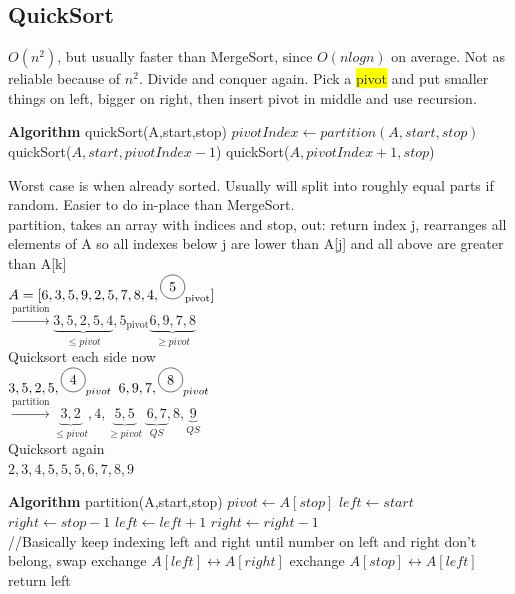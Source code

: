 \subsection{QuickSort}
$O(n^2)$, but usually faster than MergeSort, since $O(n log n)$ on average. Not as reliable because of $n^2$. Divide and conquer again. Pick a \colorbox{Yellow}{pivot} and put smaller things on left, bigger on right, then insert pivot in middle and use recursion.
\begin{algorithmic}
	\State \textbf{Algorithm} quickSort(A,start,stop)
		\State $pivotIndex \gets partition(A,start,stop)$
		\State quickSort($A,start,pivotIndex-1$)
		\State quickSort($A,pivotIndex+1,stop$)
	\EndIf
\end{algorithmic}
Worst case is when already sorted. Usually will split into roughly equal parts if random. Easier to do in-place than MergeSort.
\\ partition, takes an array with indices and stop, out: return index j, rearranges all elements of A so all indexes below j are lower than A[j] and all above are greater than A[k]
\\ $A = [6, 3, 5, 9, 2, 5, 7, 8, 4, \tikz \node[draw,circle]{5};_{\text{pivot}}]$
\\ $\stackrel{\text{partition}}{\rightarrow} \underbrace{3,5,2,5,4}_{\leq pivot}, 5_{\text{pivot}}\underbrace{6,9,7,8}_{\geq pivot}$
\\ Quicksort each side now
\\$ 3,5,2,5,\tikz\node[draw,circle]{4};_{pivot}$\hspace{20 pt} $6,9,7,\tikz\node[draw,circle]{8};_{pivot}$
\\ $\stackrel{\text{partition}}{\rightarrow}\underbrace{3,2}_{\leq pivot}, 4 ,\underbrace{5,5}_{\geq pivot}$ \hspace{20 pt} $\underbrace{6,7}_{QS},8,\underbrace{9}_{QS}$
\\ Quicksort again
\\ $2,3,4,5,5,5,6,7,8,9$
\begin{algorithmic}
	\State \textbf{Algorithm} partition(A,start,stop)
	\State $pivot \gets A[stop]$
	\State $left \gets start$
	\State $right \gets stop-1$
		 $left \gets left+1$
		\EndWhile
		 $right \gets right-1$
		\EndWhile
		\\ //Basically keep indexing left and right until number on left and right don't belong, swap
		 exchange $A[left]\leftrightarrow A[right]$
		\EndIf
	\EndWhile
	\State exchange $A[stop]\leftrightarrow A[left]$
	\State return left
\end{algorithmic}
\color{Orange}
